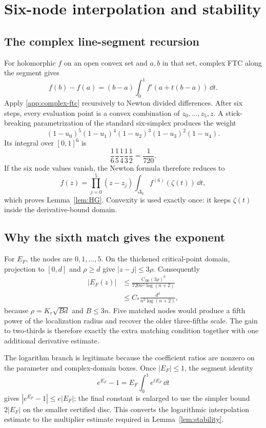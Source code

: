 \section{Six-node interpolation and stability}\label{app:HG-details}

\subsection{The complex line-segment recursion}

For holomorphic $f$ on an open convex set and $a,b$ in that set, complex FTC
along the segment gives
\begin{equation}\label{app:complex-ftc}
 f(b)-f(a)=(b-a)\int_0^1f'(a+t(b-a))\,\dd t.
\end{equation}
Apply \eqref{app:complex-ftc} recursively to Newton divided differences.
After six steps, every evaluation point is a convex combination of
$z_0,\ldots,z_5,z$.  A stick-breaking parametrization of the standard
six-simplex produces the weight
\[
 (1-u_0)^5(1-u_1)^4(1-u_2)^3(1-u_3)^2(1-u_4).
\]
Its integral over $[0,1]^6$ is
\[
 \frac16\frac15\frac14\frac13\frac12=\frac1{720}.
\]
If the six node values vanish, the Newton formula therefore reduces to
\[
 f(z)=\prod_{j=0}^5(z-z_j)
 \int_{\Delta_6}f^{(6)}(\zeta(t))\,\dd t,
\]
which proves Lemma~\ref{lem:HG}.  Convexity is used exactly once: it keeps
$\zeta(t)$ inside the derivative-bound domain.

\subsection{Why the sixth match gives the exponent}

For $E_F$, the nodes are $0,1,\ldots,5$.  On the thickened critical-point
domain, projection to $[0,d]$ and $\rho\ge d$ give $|z-j|\le3\rho$.
Consequently
\begin{align*}
 |E_F(z)|
 &\le\frac{C_{B6}(3\rho)^6}{720n^5\log(n+2)}\\
 &\le C_\ast\frac{d^3}{n^2\log(n+2)},
\end{align*}
because $\rho=K_r\sqrt{Bd}$ and $B\le3n$.  Five matched nodes would produce
a fifth power of the localization radius and recover the older three-fifths
scale.  The gain to two-thirds is therefore exactly the extra matching
condition together with one additional derivative estimate.

The logarithm branch is legitimate because the coefficient ratios are
nonzero on the parameter and complex-domain boxes.  Once $|E_F|\le1$, the
segment identity
\[
 e^{E_F}-1=E_F\int_0^1e^{tE_F}\,\dd t
\]
gives $|e^{E_F}-1|\le e|E_F|$; the final constant is enlarged to use the
simpler bound $2|E_F|$ on the smaller certified disc.  This converts the
logarithmic interpolation estimate to the multiplier estimate required in
Lemma~\ref{lem:stability}.

